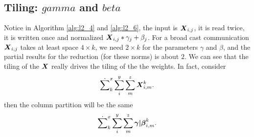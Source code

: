\documentclass[acmsmall]{acmart}
\begin{document}
\subsection{Tiling: $gamma$ and $beta$ }
Notice in Algorithm \ref{alg:l2_4} and \ref{alg:l2_6}, the input is
${\boldsymbol X}_{i,j}$, it is read twice, it is written once and normalized
${\boldsymbol X}_{i,j}*\gamma_j + \beta_j$. For a broad cast communication
${\boldsymbol X}_{i,j}$ takes at least space $4\times k$, we need $2\times k$
for the parameters $\gamma$ and $\beta$, and the partial results for
the reduction (for these norms) is about $2$. We can see that the
tiling of the ${\boldsymbol X}$ really drives the tiling of the the weights. In
fact, consider
\begin{equation}
\dot\sum_k^x\sum_{i}^y\sum_{m}^z{\boldsymbol X}^{k}_{i,m}.
\end{equation}
then the column partition will be the same
\begin{equation}
  \dot\sum_k^x\sum_{i}^y\sum_{m}^z{\boldsymbol {\gamma|\beta}}^{k}_{i,m}.
\end{equation}
\end{document}
